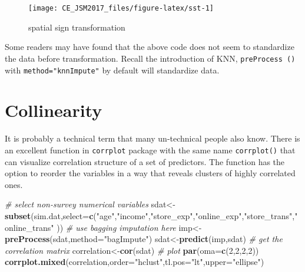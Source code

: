 \documentclass[]{book}
\newenvironment{Shaded}{\begin{snugshade}}{\end{snugshade}}
\newcommand{\KeywordTok}[1]{\textcolor[rgb]{0.13,0.29,0.53}{\textbf{{#1}}}}
\newcommand{\DataTypeTok}[1]{\textcolor[rgb]{0.13,0.29,0.53}{{#1}}}
\newcommand{\DecValTok}[1]{\textcolor[rgb]{0.00,0.00,0.81}{{#1}}}
\newcommand{\StringTok}[1]{\textcolor[rgb]{0.31,0.60,0.02}{{#1}}}
\newcommand{\CommentTok}[1]{\textcolor[rgb]{0.56,0.35,0.01}{\textit{{#1}}}}
\newcommand{\NormalTok}[1]{{#1}}
\theoremstyle{definition}
\theoremstyle{definition}
\theoremstyle{remark}
\begin{document}
\begin{figure}

{\centering \texttt{[image: CE\_JSM2017\_files/figure-latex/sst-1]} 

}

\caption{spatial sign transformation}\label{fig:sst}
\end{figure}

Some readers may have found that the above code does not seem to
standardize the data before transformation. Recall the introduction of
KNN, \texttt{preProcess\ ()} with \texttt{method="knnImpute"} by default
will standardize data.

\section{Collinearity}\label{collinearity}

It is probably a technical term that many un-technical people also know.
There is an excellent function in \texttt{corrplot} package with the
same name \texttt{corrplot()} that can visualize correlation structure
of a set of predictors. The function has the option to reorder the
variables in a way that reveals clusters of highly correlated ones.

\begin{Shaded}
\begin{Highlighting}[]
\CommentTok{# select non-survey numerical variables}
\NormalTok{sdat<-}\KeywordTok{subset}\NormalTok{(sim.dat,}\DataTypeTok{select=}\KeywordTok{c}\NormalTok{(}\StringTok{"age"}\NormalTok{,}\StringTok{"income"}\NormalTok{,}\StringTok{"store_exp"}\NormalTok{,}\StringTok{"online_exp"}\NormalTok{,}\StringTok{"store_trans"}\NormalTok{,}\StringTok{"online_trans"} \NormalTok{))}
\CommentTok{# use bagging imputation here}
\NormalTok{imp<-}\KeywordTok{preProcess}\NormalTok{(sdat,}\DataTypeTok{method=}\StringTok{"bagImpute"}\NormalTok{)}
\NormalTok{sdat<-}\KeywordTok{predict}\NormalTok{(imp,sdat)}
\CommentTok{# get the correlation matrix}
\NormalTok{correlation<-}\KeywordTok{cor}\NormalTok{(sdat)}
\CommentTok{# plot }
\KeywordTok{par}\NormalTok{(}\DataTypeTok{oma=}\KeywordTok{c}\NormalTok{(}\DecValTok{2}\NormalTok{,}\DecValTok{2}\NormalTok{,}\DecValTok{2}\NormalTok{,}\DecValTok{2}\NormalTok{))}
\KeywordTok{corrplot.mixed}\NormalTok{(correlation,}\DataTypeTok{order=}\StringTok{"hclust"}\NormalTok{,}\DataTypeTok{tl.pos=}\StringTok{"lt"}\NormalTok{,}\DataTypeTok{upper=}\StringTok{"ellipse"}\NormalTok{)}
\end{Highlighting}
\end{Shaded}
\end{document}
